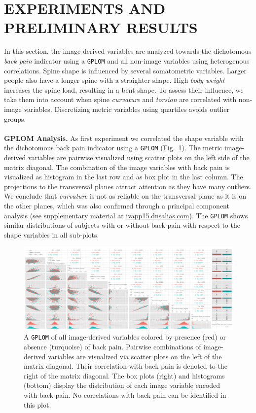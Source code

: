 \documentclass[a4paper,twoside]{style/article}
\begin{document}
\section{\uppercase{Experiments and Preliminary Results}}
\label{sec:Experiments}
\noindent In this section, the image-derived variables are analyzed towards the dichotomous \emph{back pain} indicator using a \texttt{GPLOM} and all non-image variables using heterogenous correlations.
Spine shape is influenced by several somatometric variables.
Larger people also have a longer spine with a straighter shape.
High \emph{body weight} increases the spine load, resulting in a bent shape.
To assess their influence, we take them into account when spine \emph{curvature} and \emph{torsion} are correlated with non-image variables.
Discretizing metric variables using quartiles avoids outlier groups.
\\\\
\noindent \textbf{GPLOM Analysis.}
As first experiment we correlated the shape variable with the dichotomous back pain indicator using a \texttt{GPLOM} (Fig.~\ref{fig:image-parameter-range}).
The metric image-derived variables are pairwise visualized using scatter plots on the left side of the matrix diagonal.
The combination of the image variables with back pain is visualized as histogram in the last row and as box plot in the last column.
The projections to the transversal planes attract attention as they have many outliers.
We conclude that \emph{curvature} is not as reliable on the transversal plane as it is on the other planes, which was also confirmed through a principal component analysis (see supplementary material at \url{ivapp15.dnsalias.com}).
The \texttt{GPLOM} shows similar distributions of subjects with or without back pain with respect to the shape variables in all sub-plots.
\begin{figure}[htb]
  \centering
  \includegraphics[width=1.0\textwidth]{figures/image-parameter-range}
  \caption{
A \texttt{GPLOM} of all image-derived variables colored by presence (red) or absence (turquoise) of back pain.
Pairwise combinations of image-derived variables are visualized via scatter plots on the left of the matrix diagonal.
Their correlation with back pain is denoted to the right of the matrix diagonal.
The box plots (right) and histograms (bottom) display the distribution of each image variable encoded with back pain.
No correlations with back pain can be identified in this plot.
}
  \label{fig:image-parameter-range}
\end{figure}
\end{document}
